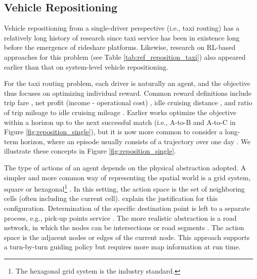\documentclass{article}
\newcommand{\tq}[1]{\textcolor{red}{#1}}
\begin{document}
\subsection{Vehicle Repositioning}\label{sec:reposition}
Vehicle repositioning from a single-driver perspective (i.e., taxi routing) has a relatively long history of research
since taxi service has been in existence long before the emergence of rideshare platforms. Likewise, research on RL-based approaches for this problem (see Table \ref{tab:ref_reposition_taxi}) also appeared earlier than that on system-level vehicle repositioning. 

For the taxi routing problem, each driver is naturally an agent, and the objective thus focuses on optimizing individual reward. Common reward definitions include trip fare \citep{rong2016rich}, net profit (income - operational cost) \citep{verma2017augmenting}, idle cruising distance \citep{garg2018route}, and ratio of trip mileage to idle cruising mileage \citep{gao2018optimize}.
Earlier works \cite{han2016routing,wen2017rebalancing,verma2017augmenting,garg2018route} optimize the objective within a horizon up to the next successful match (i.e., A-to-B and A-to-C in Figure \ref{fig:reposition_single}), but it is now more common to consider a long-term horizon, where an episode usually consists of a trajectory over one day \citep{lin2018efficient,shou2020optimal,jtq2021repos}. We illustrate these concepts in Figure \ref{fig:reposition_single}.

The type of actions of an agent depends on the physical abstraction adopted. A simpler and more common way of representing the spatial world is a grid system, square or hexagonal\footnote{The hexagonal grid system is the industry standard.} \citep{han2016routing,wen2017rebalancing,verma2017augmenting,gao2018optimize,lin2018efficient,rong2016rich,jtq2021repos,shou2020optimal}. In this setting, the action space is the set of neighboring cells (often including the current cell). \cite{shou2020reward} explain the justification for this configuration. Determination of the specific destination point is left to a separate process, e.g., pick-up points service \citep{jtq2021repos}. The more realistic abstraction is a road network, in which the nodes can be intersections or road segments \citep{garg2018route,yu2019markov,zhou2018optimizing,schmollsemi}. The action space is the adjacent nodes or edges of the current node. This approach supports a turn-by-turn guiding policy but requires more map information at run time. 
\end{document}
